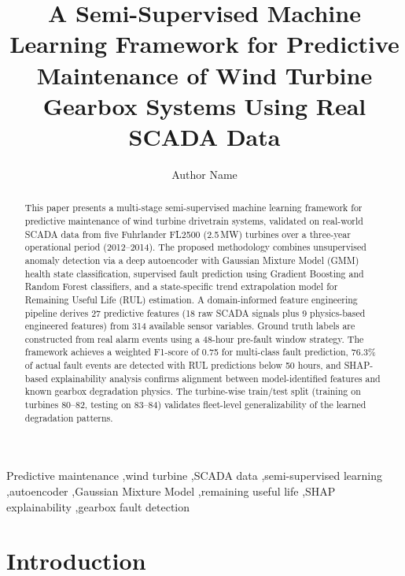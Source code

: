 \documentclass[preprint,12pt]{elsarticle}
\begin{document}
\begin{frontmatter}

\title{A Semi-Supervised Machine Learning Framework for Predictive Maintenance of Wind Turbine Gearbox Systems Using Real SCADA Data}

\author{Author Name}
\address{Affiliation}

\begin{abstract}
This paper presents a multi-stage semi-supervised machine learning framework for predictive maintenance of wind turbine drivetrain systems, validated on real-world SCADA data from five Fuhrlander FL2500 (2.5\,MW) turbines over a three-year operational period (2012--2014). The proposed methodology combines unsupervised anomaly detection via a deep autoencoder with Gaussian Mixture Model (GMM) health state classification, supervised fault prediction using Gradient Boosting and Random Forest classifiers, and a state-specific trend extrapolation model for Remaining Useful Life (RUL) estimation. A domain-informed feature engineering pipeline derives 27 predictive features (18 raw SCADA signals plus 9 physics-based engineered features) from 314 available sensor variables. Ground truth labels are constructed from real alarm events using a 48-hour pre-fault window strategy. The framework achieves a weighted F1-score of 0.75 for multi-class fault prediction, 76.3\% of actual fault events are detected with RUL predictions below 50 hours, and SHAP-based explainability analysis confirms alignment between model-identified features and known gearbox degradation physics. The turbine-wise train/test split (training on turbines 80--82, testing on 83--84) validates fleet-level generalizability of the learned degradation patterns.
\end{abstract}

\begin{keyword}
Predictive maintenance \sep wind turbine \sep SCADA data \sep semi-supervised learning \sep autoencoder \sep Gaussian Mixture Model \sep remaining useful life \sep SHAP explainability \sep gearbox fault detection
\end{keyword}

\end{frontmatter}

\section{Introduction}
\label{sec:introduction}
\end{document}
